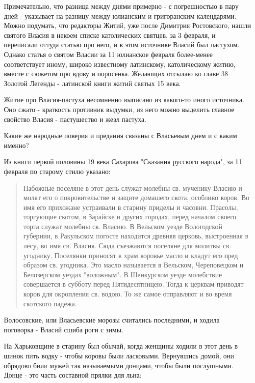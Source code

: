 \documentclass[a5paper,11pt,openany]{article}
\begin{document}
   Примечательно, что разница между днями примерно - с погрешностью в пару дней - указывает на разницу между юлианским и григоранским календарями. Можно подумать, что редакторы Житий, уже после Димитрия Ростовского, нашли святого Власия в некоем списке католических святцев, за 3 февраля, и переписали оттуда статью про него, и в этом источнике Власий был пастухом. Однако статья о святом Власии за 11 юлианское февраля более-менее соответствует иному, широко известному латинскому, католическому житию, вместе с сюжетом про вдову и поросенка. Желающих отсылаю ко главе 38 Золотой Легенды - латинской книги житий святых 15 века.

    Житие про Власия-пастуха несомненно выписано из какого-то иного источника. Оно сжато - краткость противник выдумки, из него можно выделить главное свойство Власия - пастушество и жезл пастуха.

   Какие же народные поверия и предания связаны с Власьевым днем и с каким именно?

   Из книги первой половины 19 века Сахарова "Сказания русского народа", за 11 февраля по старому стилю указано:

\begin{quotation}
\noindent Набожные поселяне в этот день служат молебны св. мученику Власию и молят его о покровительстве и защите домашего скота, особливо коров. Во имя его прихожане устраивали в старину приделы и часовни. Прасолы, торгующие скотом, в Зарайске и других городах, перед началом своего торга служат молебны св. Власию. В Вельском уезде Вологодской губернии, в Ракульском погосте находится древняя церковь, выстроенная в лесу, во имя св. Власия. Сюда съезжаются поселяне для молитвы св. угоднику. Поселянки приносят в храм коровье масло и кладут его пред образом св. угодника. Это масло называется в Вельском, Череповецком и Белозерском уездах "воложным". В Шенкурском уезде молебствие совершается в субботу перед Пятидесятницею. Тогда к церквам приводят коров для окропления св. водою. То же самое отправляют и во время скотского падежа.
\end{quotation}

   Волосовские, или Власьевские морозы считались последними, и ходила поговорка - Власий сшиба роги с зимы.

   На Харьковщине в старину был обычай, когда женщины ходили в этот день в шинок пить водку - чтобы коровы были ласковыми. Вернувшись домой, они обрядово били мужей так называемыми донцами, чтобы были послушными. Донце - это часть составной прялки для льна:
\end{document}
